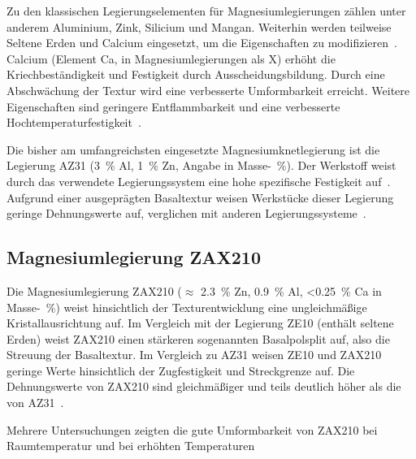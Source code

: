 Zu den klassischen Legierungselementen für Magnesiumlegierungen zählen unter anderem Aluminium, Zink, Silicium und Mangan.
Weiterhin werden teilweise Seltene Erden und Calcium eingesetzt, um die Eigenschaften zu modifizieren~\cite{Rout2020}.
Calcium (Element Ca, in Magnesiumlegierungen als X) erhöht die Kriechbeständigkeit und Festigkeit durch Ausscheidungsbildung.
Durch eine Abschwächung der Textur wird eine verbesserte Umformbarkeit erreicht.
Weitere Eigenschaften sind geringere Entflammbarkeit und eine verbesserte Hochtemperaturfestigkeit~\cite{Yi2016}.

Die bisher am umfangreichsten eingesetzte Magnesiumknetlegierung ist die Legierung AZ31 (\SI{3}{\percent} Al, \SI{1}{\percent} Zn, Angabe in Masse-\SI{}{\percent}).
Der Werkstoff weist durch das verwendete Legierungssystem eine hohe spezifische Festigkeit auf~\cite{Droeder1999}.
Aufgrund einer ausgeprägten Basaltextur weisen Werkstücke dieser Legierung geringe Dehnungswerte auf, verglichen mit anderen Legierungssysteme~\cite{Stutz2015}.


\subsection{Magnesiumlegierung ZAX210}\label{subsec:zax}

Die Magnesiumlegierung ZAX210 ($\approx$ \SI{2,3}{\percent} Zn, \SI{0,9}{\percent} Al, <\SI{0,25}{\percent} Ca in Masse-\SI{}{\percent}) weist hinsichtlich der Texturentwicklung eine ungleichmäßige Kristallausrichtung auf.
Im Vergleich mit der Legierung ZE10 (enthält seltene Erden) weist ZAX210 einen stärkeren sogenannten Basalpolsplit auf, also die Streuung der Basaltextur.
Im Vergleich zu AZ31 weisen ZE10 und ZAX210 geringe Werte hinsichtlich der Zugfestigkeit und Streckgrenze auf.
Die Dehnungswerte von ZAX210 sind gleichmäßiger und teils deutlich höher als die von AZ31~\cite{Ullmann2019}.

Mehrere Untersuchungen zeigten die gute Umformbarkeit von ZAX210 bei Raumtemperatur und bei erhöhten Temperaturen~\cite{Ullmann2019,Laser2008}


